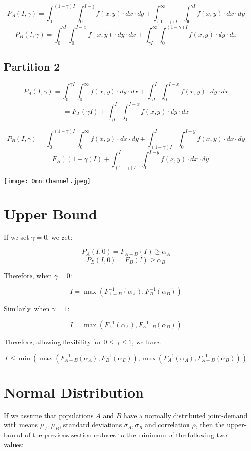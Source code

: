 \documentclass[11pt]{article}   	%
\begin{document}
$$P_A(I, \gamma) = \int_0^{(1-\gamma) I} \int_0^{I-y} f(x,y) \cdot dx \cdot dy + \int_{(1-\gamma) I}^{\infty} \int_0^{\gamma I} f(x,y) \cdot dx \cdot dy$$
$$P_B(I, \gamma) = \int_0^{\gamma I} \int_0^{I-x} f(x,y) \cdot dy \cdot dx + \int_{\gamma I}^{\infty} \int_0^{(1-\gamma) I} f(x,y) \cdot dy \cdot dx$$

\subsection{Partition 2}

$$P_A(I, \gamma) = \int_0^{\gamma I} \int_0^{\infty} f(x,y) \cdot dy \cdot dx + \int_{\gamma I}^{I} \int_0^{I-x}f(x,y) \cdot dy \cdot dx$$
$$ = F_A(\gamma I) + \int_{\gamma I}^{I} \int_0^{I-x}f(x,y) \cdot dy \cdot dx$$

$$P_B(I, \gamma) = \int_0^{(1-\gamma) I} \int_0^{\infty} f(x,y) \cdot dx \cdot dy + \int_{(1-\gamma) I}^{I} \int_0^{I-y}f(x,y) \cdot dx \cdot dy$$
$$ = F_B((1-\gamma) I) + \int_{(1-\gamma) I}^{I} \int_0^{I-y}f(x,y) \cdot dx \cdot dy$$

\texttt{[image: OmniChannel.jpeg]}

\section{Upper Bound}

If we set $\gamma = 0$, we get:

$$P_A(I, 0) = F_{A+B}(I) \geq \alpha_A$$
$$P_B(I, 0) = F_B(I) \geq \alpha_B$$

Therefore, when $\gamma = 0$:

$$I = \max{(F_{A+B}^{-1}(\alpha_A), F_B^{-1}(\alpha_B))}$$

Similarly, when $\gamma = 1$:

$$I = \max{(F_A^{-1}(\alpha_A), F_{A+B}^{-1}(\alpha_B))}$$

Therefore, allowing flexibility for $0 \leq \gamma \leq 1$, we have:

$$I \leq \min{(\max{(F_{A+B}^{-1}(\alpha_A), F_B^{-1}(\alpha_B))}, \max{(F_A^{-1}(\alpha_A), F_{A+B}^{-1}(\alpha_B))})}$$

\section{Normal Distribution}
If we assume that populations $A$ and $B$ have a normally distributed joint-demand with means $\mu_A, \mu_B$, standard deviations $\sigma_A, \sigma_B$ and correlation $\rho$, then the upper-bound of the previous section reduces to the minimum of the following two values:
\end{document}
